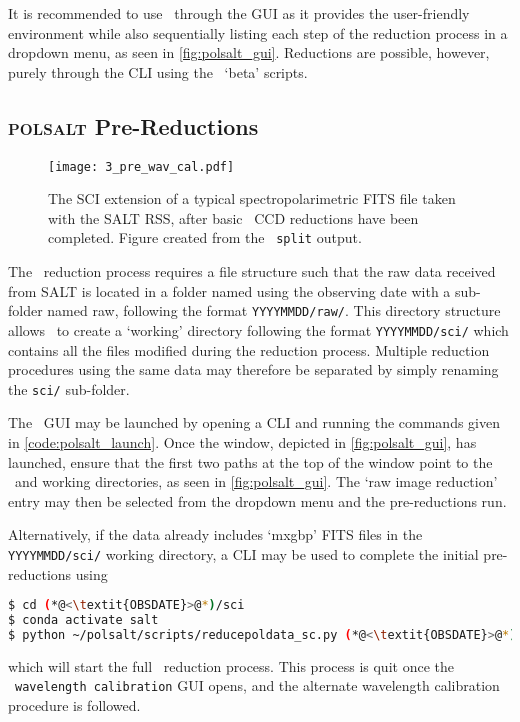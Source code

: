 \pagebreak

It is recommended to use \polsalt\ through the \gls{GUI} as it provides the user-friendly environment while also sequentially listing each step of the reduction process in a dropdown menu, as seen in \autoref{fig:polsalt_gui}. Reductions are possible, however, purely through the \gls{CLI} using the \polsalt\ `beta' scripts.

\subsection{\textsc{polsalt} Pre-Reductions} \label{subsec:reduc_pre}

\begin{figure}[t]
    \centering
    \texttt{[image: 3\_pre\_wav\_cal.pdf]}
    \caption{The \gls{SCI} extension of a typical spectropolarimetric \acs{FITS} file taken with the \gls{SALT} \gls{RSS}, after basic \polsalt\ \gls{CCD} reductions have been completed. Figure created from the \stops\ \texttt{split} output.}
    \label{fig:polsalt_pre_wav_cal}
\end{figure}

The \polsalt\ reduction process requires a file structure such that the raw data received from \gls{SALT} is located in a folder named using the observing date with a sub-folder named raw, following the format \texttt{YYYYMMDD/raw/}. This directory structure allows \polsalt\ to create a `working' directory following the format \texttt{YYYYMMDD/sci/} which contains all the files modified during the reduction process. Multiple reduction procedures using the same data may therefore be separated by simply renaming the \texttt{sci/} sub-folder.

The \polsalt\ \gls{GUI} may be launched by opening a \gls{CLI} and running the commands given in \autoref{code:polsalt_launch}. Once the window, depicted in \autoref{fig:polsalt_gui}, has launched, ensure that the first two paths at the top of the window point to the \polsalt\ and working directories, as seen in \autoref{fig:polsalt_gui}. The `raw image reduction' entry may then be selected from the dropdown menu and the pre-reductions run.

Alternatively, if the data already includes `mxgbp' \gls{FITS} files in the \texttt{YYYYMMDD/sci/} working directory, a \gls{CLI} may be used to complete the initial pre-reductions using
\begin{lstlisting}[language=bash]
$ cd (*@<\textit{OBSDATE}>@*)/sci
$ conda activate salt
$ python ~/polsalt/scripts/reducepoldata_sc.py (*@<\textit{OBSDATE}>@*)
\end{lstlisting}
{\parskip=0pt which} will start the full \polsalt\ reduction process. This process is quit once the \polsalt\ \texttt{wavelength calibration} \gls{GUI} opens, and the alternate wavelength calibration procedure is followed.

